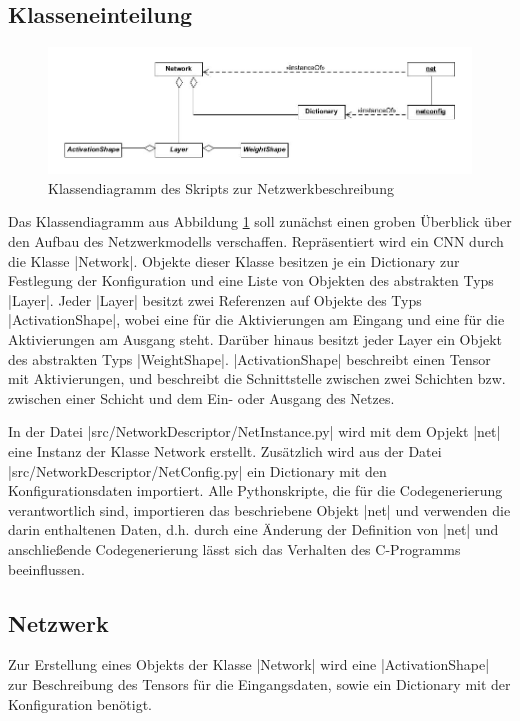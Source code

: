 \documentclass[../main.tex]{subfiles}
\begin{document}
\subsection{Klasseneinteilung}
\begin{figure}
	\centering 
	\includegraphics[width=\textwidth]{../images/Schmidt/cd_netdesc.jpg} 
	\caption {Klassendiagramm des Skripts zur Netzwerkbeschreibung}
	\label{pic:cd_Netdesc} 
\end{figure} 
Das Klassendiagramm aus Abbildung \ref{pic:cd_Netdesc} soll zunächst einen groben Überblick  über den Aufbau des Netzwerkmodells verschaffen. Repräsentiert wird ein CNN durch die Klasse |Network|. Objekte dieser Klasse besitzen je ein Dictionary zur Festlegung der Konfiguration und eine Liste von Objekten des abstrakten Typs |Layer|. Jeder |Layer| besitzt zwei Referenzen auf Objekte des Typs |ActivationShape|, wobei eine für die Aktivierungen am Eingang und eine für die Aktivierungen am Ausgang steht. Darüber hinaus besitzt jeder Layer ein Objekt des abstrakten Typs |WeightShape|. |ActivationShape| beschreibt einen Tensor mit Aktivierungen, und beschreibt die Schnittstelle zwischen zwei Schichten bzw. zwischen einer Schicht und dem Ein- oder Ausgang des Netzes. 

In der Datei |src/NetworkDescriptor/NetInstance.py| wird mit dem Opjekt |net| eine Instanz der Klasse Network erstellt. Zusätzlich wird aus der Datei |src/NetworkDescriptor/NetConfig.py| ein Dictionary mit den Konfigurationsdaten importiert. Alle Pythonskripte, die für die Codegenerierung verantwortlich sind, importieren das beschriebene Objekt |net| und verwenden die darin enthaltenen Daten, d.h. durch eine Änderung der Definition von |net| und anschließende Codegenerierung lässt sich das Verhalten des C-Programms beeinflussen. 

\subsection{Netzwerk}
Zur Erstellung eines Objekts der Klasse |Network| wird eine |ActivationShape| zur Beschreibung des Tensors für die Eingangsdaten, sowie ein Dictionary mit der Konfiguration benötigt. 
\end{document}
